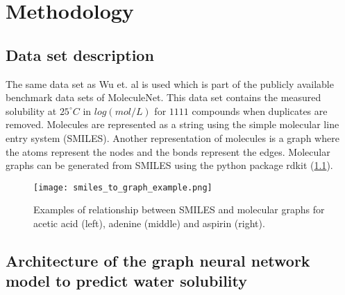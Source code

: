\chapter{Methodology}


\section{Data set description}

The same data set as Wu et. al is used which is part of the publicly available 
benchmark data sets of MoleculeNet.\cite{wu2018moleculenet} This data set contains 
the measured solubility at $25^{\circ} C$ in $log(mol/L)$ for $1111$ compounds when duplicates 
are removed. Molecules are represented as a string using the simple molecular 
line entry system \big(SMILES\big).\cite{weininger1988smiles} Another representation 
of molecules is a graph where the atoms represent the nodes and the bonds represent 
the edges. Molecular graphs can be generated from SMILES using the python package 
rdkit (\cref{fig:smiles_and_graphs}).\cite{landrum2010r}


\begin{figure}[h]
    \centering
    \texttt{[image: smiles\_to\_graph\_example.png]}
    \caption{Examples of relationship between SMILES and molecular graphs for acetic acid (left),
    adenine (middle) and aspirin (right).}
    \label{fig:smiles_and_graphs}
\end{figure}



\section{Architecture of the graph neural network model to predict water solubility}
